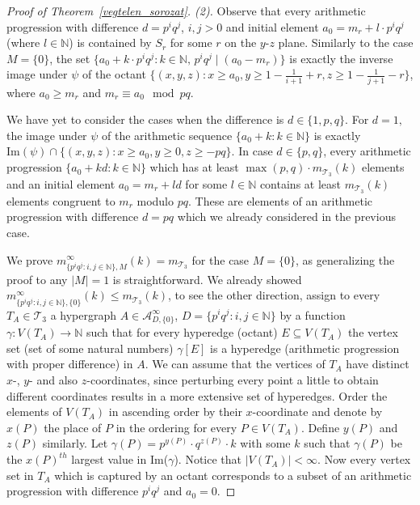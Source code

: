 \documentclass[11pt,oneside]{amsart}
\newcommand{\N}{\mathbb{N}}
\begin{document}
\begin{proof}[Proof of Theorem~\ref{vegtelen_sorozat}. (2)]
Observe that every arithmetic progression with difference $d=p^iq^j$, $i, j>0$ and initial element $a_0=m_r+l\cdot p^iq^j$ (where $l\in\N$) is contained by $S_r$ for some $r$ on the $y$-$z$ plane. Similarly to the case $M=\{0\}$, the set $\{a_0 + k \cdot p^iq^j: k \in \mathbb{N},\,p^iq^j\mid (a_0-m_r)\}$ is exactly the inverse image under $\psi$ of the octant  $\{(x,y,z): x \geq a_0, y \geq 1-\frac{1}{i+1}+r, z \geq 1-\frac{1}{j+1}-r \}$, where $a_0\ge m_r$ and $m_r \equiv a_0 \mod pq$.


We have yet to consider the cases when the difference is $d\in\{1,p,q\}$. For $d=1,$ the image under $\psi$ of the arithmetic sequence $\{a_0+k: k\in\N\}$ is exactly $\mathrm{Im}(\psi)\cap \{(x,y,z): x\ge a_0, y\ge 0,z\ge -pq\}$. In case $d\in\{p,q\}$, every arithmetic progression $\{a_0+kd: k\in\N\}$ which has at least $\max(p,q)\cdot m_{\mathcal{T}_3}(k) $ elements  and an initial element $a_0=m_r+ld$ for some $l\in\N$
contains at least $m_{\mathcal{T}_3}(k)$ elements congruent to $m_r$ modulo $pq.$ These are elements of an arithmetic progression with difference $d=pq$ which we already considered in the previous case.

We prove $m_{\{p^iq^j:i,j \in \mathbb{N}\}, M}^{\infty}(k) = m_{\mathcal{T}_3}$ for the case $M=\{0\}$, as generalizing the proof to any $|M|=1$ is straightforward. We already showed $m_{\{p^iq^j:i,j \in \mathbb{N}\},\{0\}}^{\infty}(k) \le m_{\mathcal{T}_3}(k)$, to see the other direction, assign to every $T_A \in \mathcal{T}_3$ a hypergraph $A \in \mathcal{A}_{D,\{0\}}^{\infty}$, $D = \{p^iq^j:i,j \in \mathbb{N}\}$ by a function $\gamma: V(T_A) \to \mathbb{N}$ such that for every hyperedge (octant) $E\subseteq V(T_A)$ the vertex set (set of some natural numbers) $\gamma[E]$ is a hyperedge (arithmetic progression with proper difference) in $A$. We can assume that the vertices of $T_A$ have distinct $x$-, $y$- and also $z$-coordinates, since perturbing every point a little to obtain different coordinates results in a more extensive set of hyperedges. Order the elements of $V(T_A)$ in ascending order by their $x$-coordinate and denote by $x(P)$ the place of $P$ in the ordering for every $P \in V(T_A)$. Define $y(P)$ and $z(P)$ similarly. Let $\gamma(P) = p^{y(P)} \cdot q^{z(P)} \cdot k$ with some $k$ such that $\gamma(P)$ be the $x(P)^{th}$ largest value in {\rm Im}($\gamma$). Notice that $|V(T_A)|<\infty$. Now every vertex set in $T_A$ which is captured by an octant corresponds to a subset of an arithmetic progression with difference $p^iq^j$ and $a_0=0$.
\end{proof}
\end{document}
